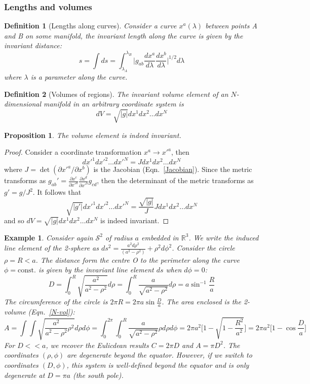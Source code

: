 \documentclass[a4paper]{article}
\newtheorem{eg}{Example}[section]
\theoremstyle{new}
\newtheorem{defi}{Definition}[section]
\newtheorem{prop}{Proposition}[section]
\begin{document}
\subsubsection{Lengths and volumes}
\begin{defi}[Lengths along curves]
Consider a curve $x^a(\lambda)$ between points A and B on some manifold, the invariant length along the curve is given by the invariant distance:
\begin{equation}
s=\int ds=\int_{\lambda_A}^{\lambda_B}\bigg|g_{ab}\frac{dx^a}{d\lambda}\frac{dx^b}{d\lambda}\bigg|^{1/2}d\lambda\label{length}
\end{equation}
where $\lambda$ is a parameter along the curve.
\end{defi}
\begin{defi}[Volumes of regions]
The invariant volume element of an $N$-dimensional manifold in an arbitrary coordinate system is
\begin{equation}
dV=\sqrt{|g|}dx^1dx^2\dots dx^N\label{N-vol}
\end{equation}
\end{defi}
\begin{prop}
The volume element is indeed invariant.
\end{prop}
\begin{proof}
Consider a coordinate transformation $x^a\rightarrow x'^a$, then
$$dx'^1dx'^2\dots dx'^N=Jdx^1dx^2\dots dx^N$$
where $J=\det(\partial x'^a/\partial x^b)$ is the Jacobian (Eqn.~\ref{Jacobian}). Since the metric transforms as $g_{ab}'=\frac{\partial x^c}{\partial x'^a}\frac{\partial x^d}{\partial x'^b}g_{cd}$, then the determinant of the metric transforms as $g'=g/J^2$. It follows that
$$\sqrt{|g'|}dx'^1dx'^2\dots dx'^N=\frac{\sqrt{|g|}}{J}Jdx^1 dx^2\dots dx^N$$
and so $dV=\sqrt{|g|}dx^1dx^2\dots dx^N$ is indeed invariant.
\end{proof}
\begin{eg}
Consider again $\mathcal{S}^2$ of radius $a$ embedded in $\mathbb{R}^3$. We write the induced line element of the 2-sphere as $ds^2=\frac{a^2d\rho^2}{(a^2-\rho^2)}+\rho^2d\phi^2$. Consider the circle $\rho=R<a$. The distance form the centre O to the perimeter along the curve $\phi=\text{const.}$ is given by the invariant line element $ds$ when $d\phi=0$:
$$D=\int_0^R\sqrt{\frac{a^2}{a^2-\rho^2}}d\rho=\int_0^R\frac{a}{\sqrt{a^2-\rho^2}}d\rho=a\sin^{-1}\frac{R}{a}$$
The circumference of the circle is $2\pi R=2\pi a\sin\frac{D}{a}$. The area enclosed is the 2-volume (Eqn.~\ref{N-vol}):
$$A=\int\int\sqrt{\frac{a^2}{a^2-\rho^2}\rho^2}d\rho d\phi=\int_0^{2\pi}\int_0^R\frac{a}{\sqrt{a^2-\rho^2}}\rho d\rho d\phi=2\pi a^2\bigg[1-\sqrt{1-\frac{R^2}{a^2}}\bigg]=2\pi a^2\bigg[1-\cos\frac{D}{a}\bigg]$$
For $D<<a$, we recover the Eulicdean results $C=2\pi D$ and $A=\pi D^2$. The coordinates $(\rho,\phi)$ are degenerate beyond the equator. However, if we switch to coordinates $(D,\phi)$, this system is well-defined beyond the equator and is only degenerate at $D=\pi a$ (the south pole).
\end{eg}
\end{document}
